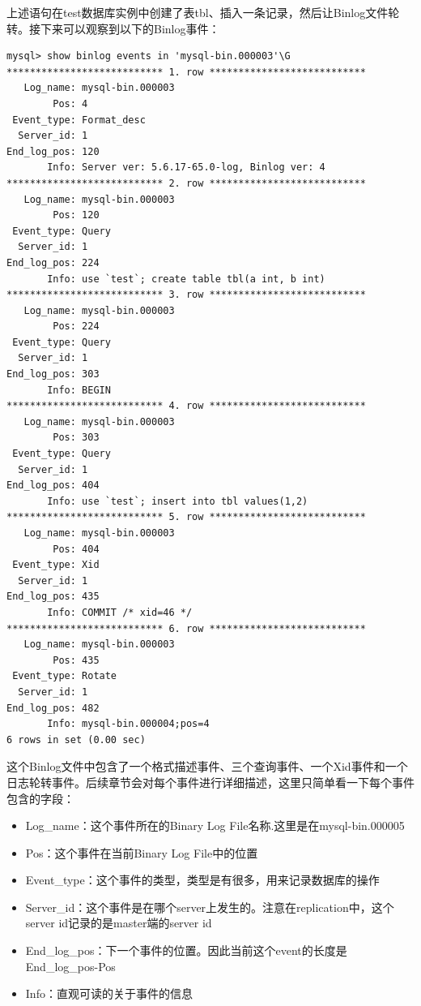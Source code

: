 \documentclass[a4paper, titlepage, 10pt, bookmark]{article}
\begin{document}
上述语句在test数据库实例中创建了表tbl、插入一条记录，然后让Binlog文件轮转。接下来可以观察到以下的Binlog事件：
\begin{spacing}{1.0}
\begin{lstlisting}
mysql> show binlog events in 'mysql-bin.000003'\G
*************************** 1. row ***************************
   Log_name: mysql-bin.000003
        Pos: 4
 Event_type: Format_desc
  Server_id: 1
End_log_pos: 120
       Info: Server ver: 5.6.17-65.0-log, Binlog ver: 4
*************************** 2. row ***************************
   Log_name: mysql-bin.000003
        Pos: 120
 Event_type: Query
  Server_id: 1
End_log_pos: 224
       Info: use `test`; create table tbl(a int, b int)
*************************** 3. row ***************************
   Log_name: mysql-bin.000003
        Pos: 224
 Event_type: Query
  Server_id: 1
End_log_pos: 303
       Info: BEGIN
*************************** 4. row ***************************
   Log_name: mysql-bin.000003
        Pos: 303
 Event_type: Query
  Server_id: 1
End_log_pos: 404
       Info: use `test`; insert into tbl values(1,2)
*************************** 5. row ***************************
   Log_name: mysql-bin.000003
        Pos: 404
 Event_type: Xid
  Server_id: 1
End_log_pos: 435
       Info: COMMIT /* xid=46 */
*************************** 6. row ***************************
   Log_name: mysql-bin.000003
        Pos: 435
 Event_type: Rotate
  Server_id: 1
End_log_pos: 482
       Info: mysql-bin.000004;pos=4
6 rows in set (0.00 sec)
\end{lstlisting}
\end{spacing}

这个Binlog文件中包含了一个格式描述事件、三个查询事件、一个Xid事件和一个日志轮转事件。后续章节会对每个事件进行详细描述，这里只简单看一下每个事件包含的字段：
\begin{itemize}
    \item Log\_name：这个事件所在的Binary Log File名称.这里是在mysql-bin.000005
    \item Pos：这个事件在当前Binary Log File中的位置
    \item Event\_type：这个事件的类型，类型是有很多，用来记录数据库的操作
    \item Server\_id：这个事件是在哪个server上发生的。注意在replication中，这个server id记录的是master端的server id
    \item End\_log\_pos：下一个事件的位置。因此当前这个event的长度是End\_log\_pos-Pos
    \item Info：直观可读的关于事件的信息
\end{itemize}
\end{document}
